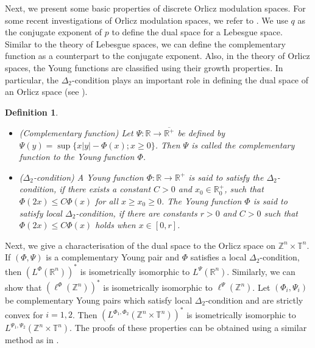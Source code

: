 \documentclass[a4paper,11pt, reqno]{amsart}
\theoremstyle{plain}
\newtheorem{Def}[theorem]{Definition}
\theoremstyle{definition}
\theoremstyle{remark}
\def \R{{\mathbb R}}
\def \Z{{\mathbb Z}}
\def \T{{\mathbb T}}
\def\R{\mathbb R}
\begin{document}
Next, we present some basic properties of discrete Orlicz modulation spaces. For some recent investigations of Orlicz modulation spaces, we refer to \cite{gum24, tof22}. We use $q$ as the conjugate exponent of $p$ to define the dual space for a Lebesgue space. Similar to the theory of Lebesgue spaces, we can define the complementary function as a counterpart to the conjugate exponent. Also, in the theory of Orlicz spaces, the Young functions are classified using their growth properties. In particular, the $\Delta_2$-condition plays an important role in defining the dual space of an Orlicz space (see \cite{sch13}). 
\begin{Def}
\begin{itemize}
\item[(1)] (Complementary function) Let $\Psi: \R \to \overline{\R^+}$ be defined by $\Psi(y) =\sup\{ x|y|- \Phi(x); x \geq 0\}$. Then $\Psi$ is called the complementary function to the Young function $\Phi$.

\item[(2)] ($\Delta_2$-condition) A Young function $\Phi : \R \to  \R^+$ is said to satisfy the $\Delta_2$-condition, if there exists a constant $C>0$ and $x_0 \in \R^+_0$, such that $\Phi(2x) \leq C \Phi(x)$ for all $x \geq x_0 \geq 0$. The Young function $\Phi$ is said to satisfy local $\Delta_2$-condition, if there are constants $r>0$ and $C>0$ such that $\Phi(2x) \leq C \Phi(x)$ holds when $x \in [0, r]$.
\end{itemize}
\end{Def}
Next, we give a characterisation of the dual space to the Orlicz space on $\Z^n \times \T^n$. If $(\Phi, \Psi)$ is a complementary Young pair and $\Phi$ satisfies a local $\Delta_2$-condition, then $\left( L^{\Phi} (\mathbb{R}^n)\right)^*$ is isometrically isomorphic to $L^{\Psi} (\mathbb{R}^n)$. Similarly, we can show that $\left(\ell^{\Phi} (\Z^n)\right)^*$ is isometrically isomorphic to $\ell^{\Psi} (\Z^n)$. Let $\left(\Phi_i, \Psi_i \right)$ be complementary Young pairs which satisfy local $\Delta_2$-condition and are strictly convex for $i = 1, 2$. Then $\left(L^{\Phi_1, \Phi_2} (\Z^n \times \T^n)\right)^*$ is isometrically isomorphic to  $L^{\Psi_1, \Psi_2} (\Z^n \times \T^n)$. The proofs of these properties can be obtained using a similar method as in \cite{rao91}. 
\end{document}
